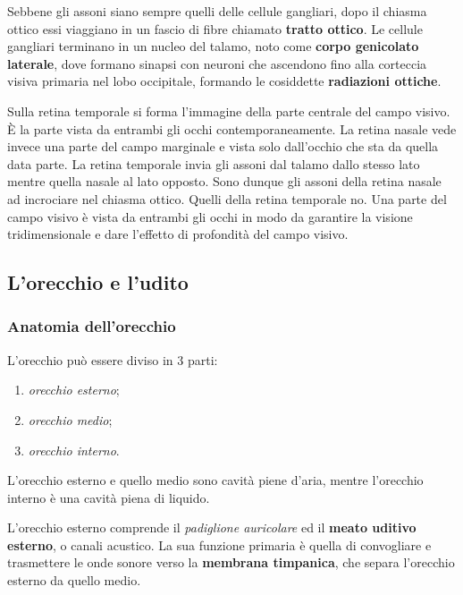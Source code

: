 \documentclass[]{article}
\begin{document}
Sebbene gli assoni siano sempre quelli delle cellule gangliari, dopo il
chiasma ottico essi viaggiano in un fascio di fibre chiamato
\textbf{tratto ottico}. Le cellule gangliari terminano in un nucleo del
talamo, noto come \textbf{corpo genicolato laterale}, dove formano
sinapsi con neuroni che ascendono fino alla corteccia visiva primaria
nel lobo occipitale, formando le cosiddette \textbf{radiazioni ottiche}.

Sulla retina temporale si forma l'immagine della parte centrale del
campo visivo. È la parte vista da entrambi gli occhi contemporaneamente.
La retina nasale vede invece una parte del campo marginale e vista solo
dall'occhio che sta da quella data parte. La retina temporale invia gli
assoni dal talamo dallo stesso lato mentre quella nasale al lato
opposto. Sono dunque gli assoni della retina nasale ad incrociare nel
chiasma ottico. Quelli della retina temporale no. Una parte del campo
visivo è vista da entrambi gli occhi in modo da garantire la visione
tridimensionale e dare l'effetto di profondità del campo visivo.

\subsection{L'orecchio e l'udito}\label{lorecchio-e-ludito}

\subsubsection{Anatomia dell'orecchio}\label{anatomia-dellorecchio}

L'orecchio può essere diviso in 3 parti:

\begin{enumerate}
\def\labelenumi{\arabic{enumi}.}
\itemsep1pt\parskip0pt
\item
  \emph{orecchio esterno};
\item
  \emph{orecchio medio};
\item
  \emph{orecchio interno}.
\end{enumerate}

L'orecchio esterno e quello medio sono cavità piene d'aria, mentre
l'orecchio interno è una cavità piena di liquido.

L'orecchio esterno comprende il \emph{padiglione auricolare} ed il
\textbf{meato uditivo esterno}, o canali acustico. La sua funzione
primaria è quella di convogliare e trasmettere le onde sonore verso la
\textbf{membrana timpanica}, che separa l'orecchio esterno da quello
medio.
\end{document}
